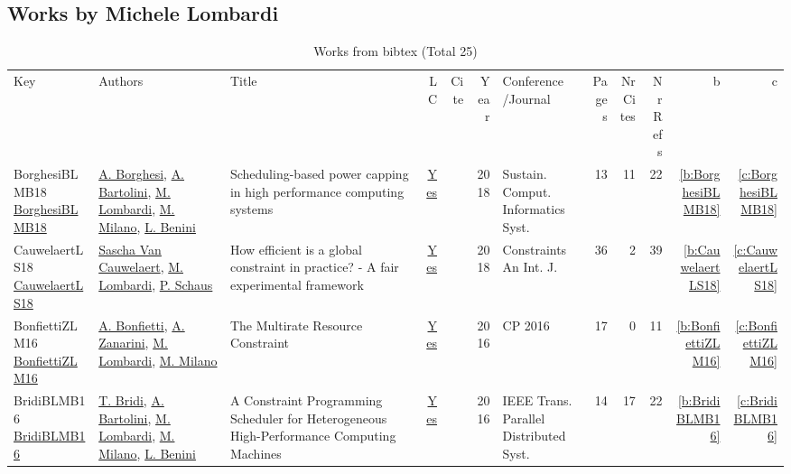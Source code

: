 \subsection{Works by Michele Lombardi}
\label{sec:a143}
{\scriptsize
\begin{longtable}{>{\raggedright\arraybackslash}p{3cm}>{\raggedright\arraybackslash}p{6cm}>{\raggedright\arraybackslash}p{6.5cm}rrrp{2.5cm}rrrrr}
\rowcolor{white}\caption{Works from bibtex (Total 25)}\\ \toprule
\rowcolor{white}Key & Authors & Title & LC & Cite & Year & \shortstack{Conference\\/Journal} & Pages & \shortstack{Nr\\Cites} & \shortstack{Nr\\Refs} & b & c \\ \midrule\endhead
\bottomrule
\endfoot
BorghesiBLMB18 \href{https://doi.org/10.1016/j.suscom.2018.05.007}{BorghesiBLMB18} & \hyperref[auth:a232]{A. Borghesi}, \hyperref[auth:a231]{A. Bartolini}, \hyperref[auth:a143]{M. Lombardi}, \hyperref[auth:a144]{M. Milano}, \hyperref[auth:a248]{L. Benini} & Scheduling-based power capping in high performance computing systems & \href{works/BorghesiBLMB18.pdf}{Yes} & \cite{BorghesiBLMB18} & 2018 & Sustain. Comput. Informatics Syst. & 13 & 11 & 22 & \ref{b:BorghesiBLMB18} & \ref{c:BorghesiBLMB18}\\
CauwelaertLS18 \href{https://doi.org/10.1007/s10601-017-9277-y}{CauwelaertLS18} & \hyperref[auth:a207]{Sascha Van Cauwelaert}, \hyperref[auth:a143]{M. Lombardi}, \hyperref[auth:a148]{P. Schaus} & How efficient is a global constraint in practice? - {A} fair experimental framework & \href{works/CauwelaertLS18.pdf}{Yes} & \cite{CauwelaertLS18} & 2018 & Constraints An Int. J. & 36 & 2 & 39 & \ref{b:CauwelaertLS18} & \ref{c:CauwelaertLS18}\\
BonfiettiZLM16 \href{https://doi.org/10.1007/978-3-319-44953-1\_8}{BonfiettiZLM16} & \hyperref[auth:a204]{A. Bonfietti}, \hyperref[auth:a205]{A. Zanarini}, \hyperref[auth:a143]{M. Lombardi}, \hyperref[auth:a144]{M. Milano} & The Multirate Resource Constraint & \href{works/BonfiettiZLM16.pdf}{Yes} & \cite{BonfiettiZLM16} & 2016 & CP 2016 & 17 & 0 & 11 & \ref{b:BonfiettiZLM16} & \ref{c:BonfiettiZLM16}\\
BridiBLMB16 \href{https://doi.org/10.1109/TPDS.2016.2516997}{BridiBLMB16} & \hyperref[auth:a233]{T. Bridi}, \hyperref[auth:a231]{A. Bartolini}, \hyperref[auth:a143]{M. Lombardi}, \hyperref[auth:a144]{M. Milano}, \hyperref[auth:a248]{L. Benini} & A Constraint Programming Scheduler for Heterogeneous High-Performance Computing Machines & \href{works/BridiBLMB16.pdf}{Yes} & \cite{BridiBLMB16} & 2016 & {IEEE} Trans. Parallel Distributed Syst. & 14 & 17 & 22 & \ref{b:BridiBLMB16} & \ref{c:BridiBLMB16}\\

\end{longtable}}
